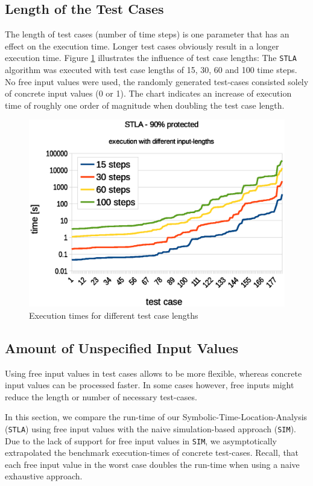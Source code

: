 \documentclass[a4paper,10pt]{article}
\begin{document}
\subsection{Length of the Test Cases}
The length of test cases (number of time steps) is one parameter that has an effect on the execution time. Longer test cases obviously result in a longer execution time.
Figure \ref{stla_input_length_chart} illustrates the influence of test case lengths: The \texttt{STLA} algorithm was executed with test case lengths of 15, 30, 60 and 100 time steps. 
No free input values were used, the randomly generated test-cases consisted solely of concrete input values (0 or 1).
The chart indicates an increase of execution time of roughly one order of magnitude when doubling the test case length.

\begin{figure}[!htb]
\centering
\includegraphics[scale = 0.64]{img/stla_input_length_chart.eps}
\centering \caption{Execution times for different test case lengths} 
\label{stla_input_length_chart}
\end{figure}

\subsection{Amount of Unspecified Input Values}
Using free input values in test cases allows to be more flexible, whereas concrete input values can be processed faster. In some cases however, free inputs might reduce the 
length or number of necessary test-cases.

In this section, we compare the run-time of our Symbolic-Time-Location-Analysis (\texttt{STLA}) using free input values with the naive simulation-based approach (\texttt{SIM}).
Due to the lack of support for free input values in \texttt{SIM}, we asymptotically extrapolated the benchmark execution-times of concrete test-cases.
Recall, that each free input value in the worst case doubles the run-time when using a naive exhaustive approach.
\end{document}
